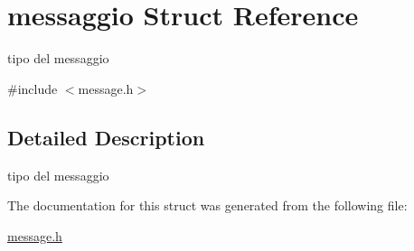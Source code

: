 \hypertarget{structmessaggio}{}\section{messaggio Struct Reference}
\label{structmessaggio}


tipo del messaggio  




{\ttfamily \#include $<$message.\+h$>$}



\subsection{Detailed Description}
tipo del messaggio 

The documentation for this struct was generated from the following file\+:\begin{DoxyCompactItemize}
\item 
\hyperlink{message_8h}{message.\+h}\end{DoxyCompactItemize}
